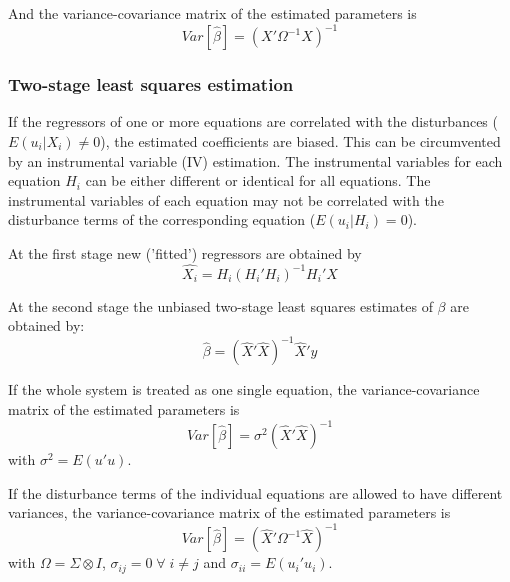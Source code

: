 \documentclass[article]{jss}
\begin{document}
And the variance-covariance matrix of the estimated parameters is
\begin{equation}
   Var \left[ \widehat{\beta} \right] = \left( X' \Omega^{-1} X \right)^{-1}
\end{equation}


\subsubsection{Two-stage least squares estimation}

If the regressors of one or more equations are correlated 
with the disturbances ($E \left( u_i | X_i \right) \neq 0$), 
the estimated coefficients are biased.
This can be circumvented by an instrumental variable (IV) estimation.
The instrumental variables for each equation $H_i$ 
can be either different or identical for all equations.
The instrumental variables of each equation may not be correlated with 
the disturbance terms of the corresponding equation 
($E \left( u_i | H_i \right) = 0$).

At the first stage new ('fitted') regressors are obtained by
\begin{equation}
   \widehat{X_i} = H_i \left( H_i' H_i \right)^{-1} H_i' X
\end{equation}

At the second stage the unbiased two-stage least squares estimates
of $\beta$ are obtained by:
\begin{equation}
   \widehat{\beta} = \left( \widehat{X}' \widehat{X} \right)^{-1} 
   \widehat{X}' y 
   \label{eq:beta2sls}
\end{equation}

If the whole system is treated as one single equation, 
the variance-covariance matrix of the estimated parameters is
\begin{equation}
   Var \left[ \widehat{\beta} \right] = \sigma^2 \left( \widehat{X}'
   \widehat{X} \right)^{-1}
\end{equation}
with $\sigma^2 = E \left( u' u \right)$.

If the disturbance terms of the individual equations 
are allowed to have different variances, 
the variance-covariance matrix of the estimated parameters is
\begin{equation}
   Var \left[ \widehat{\beta} \right] = \left( \widehat{X}' \Omega^{-1} 
   \widehat{X} \right)^{-1}
\end{equation}
with $\Omega = \Sigma \otimes I$, 
$\sigma_{ij} = 0 \; \forall \; i \neq j$ and
$\sigma_{ii} = E \left( u_i' u_i \right)$.
\end{document}
